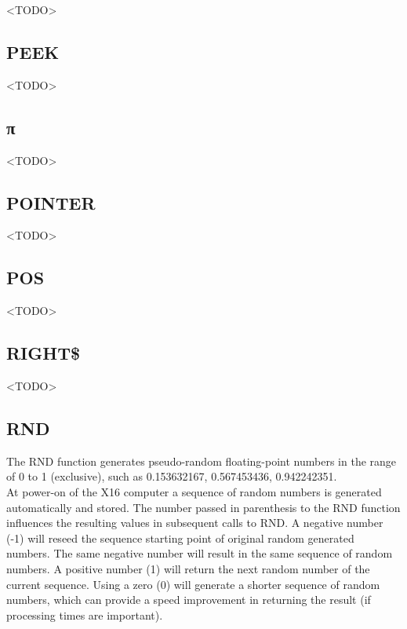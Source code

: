 <TODO>

\subsection{PEEK}

<TODO>

\subsection{\ttfamily π}

<TODO>

\subsection{POINTER}

<TODO>

\subsection{POS}

<TODO>

\subsection{RIGHT\$}

<TODO>

\subsection{RND}

The {\ttfamily RND} function generates pseudo-random floating-point numbers in
the range of 0 to 1 (exclusive), such as 0.153632167, 0.567453436,
0.942242351.\\

At power-on of the X16 computer a sequence of random numbers is generated
automatically and stored.  The number passed in parenthesis to the {\ttfamily
RND} function influences the resulting values in subsequent calls to {\ttfamily
RND}.  A negative number (-1) will reseed the sequence starting point of
original random generated numbers.  The same negative number will result in the
same sequence of random numbers.  A positive number (1) will return the next
random number of the current sequence.  Using a zero (0) will generate a
shorter sequence of random numbers, which can provide a speed improvement in
returning the result (if processing times are important).\\

